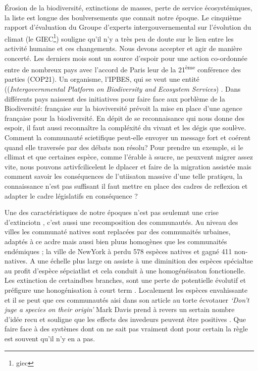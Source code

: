 Érosion de la biodiversité, extinctions de masses, perte de service
écosystémiques, la liste est longue des boulversements que connait notre
époque. Le cinquième rapport d'évaluation du Groupe d'experts
intergouvernemental sur l'évolution du climat (le GIEC\footnote{giec})
souligne qu'il n'y a très peu de doute sur le lien entre les activité
humaine et ces changements. Nous devons accepter et agir de manière
concerté. Les derniers mois sont un source d'espoir pour une action
co-ordonnée entre de nombreux pays avec l'accord de Paris leur de la
21\textsuperscript{ème} conférence des parties (COP21). Un organisme,
l'IPBES, qui se veut une entité
((\emph{Intergovernmental Platform on Biodiversity and Ecosystem Services})
\citep{Diaz2015a, Brooks2014}. Dans différents pays naissent des
initiatives pour faire face aux porblème de la Biodiversité: française
sur la bioviversité prévoit la mise en place d'une agence française pour
la biodiversité. En dépit de se reconnaisance qui nous donne des espoir,
il faut aussi reconnaître la compléxité du vivant et les dégis que
soulève. Comment la communauté scietifique peut-elle envoyer un message
fort et coérent quand elle traversée par des débats non résolu? Pour
prendre un exemple, si le cllimat et que certaines espèce, comme
l'érable à ssucre, ne peuxvent migrer assez vite, nous pouvons
artivfcilicelent le dplacer et faire de la migration assistée mais
comment savoir les conséquences de l'utiisaton massive d'une telle
pratiqeu, la connaissance n'est pas suffisant il faut mettre en place
des cadres de reflexion et adapter le cadre législatifs en conséquence
\citep{McLachlan2007}?

Une des caractéristiques de notre époques n'est pas seulemnt une crise
d'extinciotn \citep{Thomas2004}, c'est aussi une recomposition des
communautés. Au niveau des villes les communaté natives sont replacées
par des communaités urbaines, adaptés à ce acdre mais aussi bien pluus
homogènes que les communaités endémiques \citep{McKinney2006}; la ville
de NewYork à perdu 578 espèces natives et gagné 411 non-natives. A une
échelle plus large on assiste à une diminition des espèces spécialtse au
profit d'espèce sépciatlist et cela conduit à une homogénéisaton
fonctionelle. Les extinction de certaindbes branches, sont une perte de
potentielle évolutif et préfigure une honogénisation à court term
\citep{Thuiller2011}. Localement les espèces envahissante et il se peut
que ces communautés aisi dans son article au torte écvotauer
\emph{`Don't juge a species on their origin'} Mark Davis prend à revers
un sertain nombre d'idée recu et souligne que les effects des invedeurs
peuvent être positives \citep{Davis2011}. Que faire face à des systèmes
dont on ne sait pas vraiment dont pour certain la règle est souvent
qu'il n'y en a pas.

